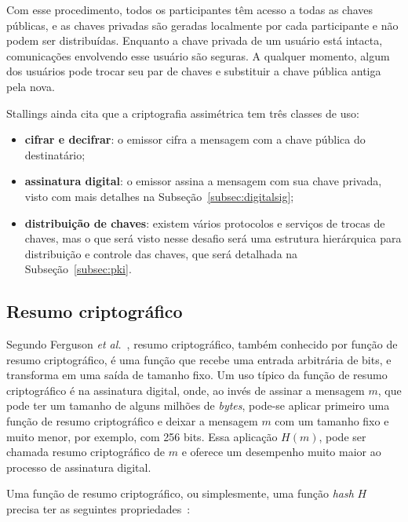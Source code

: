 \documentclass{article}
\begin{document}
Com esse procedimento, todos os participantes têm acesso a todas as chaves
públicas, e as chaves privadas são geradas localmente por cada participante
e não podem ser distribuídas. Enquanto a chave privada de um usuário está
intacta, comunicações envolvendo esse usuário são seguras. A qualquer momento,
algum dos usuários pode trocar seu par de chaves e substituir a chave pública
antiga pela nova.

Stallings ainda cita que a criptografia assimétrica tem três classes de uso:

\begin{itemize}
  \item \textbf{cifrar e decifrar}: o emissor cifra a mensagem com a chave
      pública do destinatário;

  \item \textbf{assinatura digital}: o emissor assina a mensagem com sua chave
      privada, visto com mais detalhes na Subseção~\ref{subsec:digitalsig};

  \item \textbf{distribuição de chaves}: existem vários protocolos e serviços
      de trocas de chaves, mas o que será visto nesse desafio será uma
        estrutura hierárquica para distribuição e controle das chaves, que será
        detalhada na Subseção~\ref{subsec:pki}.
\end{itemize}

\subsection{Resumo criptográfico}\label{subsec:hash}

Segundo Ferguson \textit{et al.}~\cite{Ferguson:book:2011}, resumo
criptográfico, também conhecido por função de resumo criptográfico, é uma
função que recebe uma entrada arbitrária de bits, e transforma em uma saída de
tamanho fixo. Um uso típico da função de resumo criptográfico é na assinatura
digital, onde, ao invés de assinar a mensagem $m$, que pode ter um tamanho de
alguns milhões de \textit{bytes}, pode-se aplicar primeiro uma função de resumo
criptográfico e deixar a mensagem $m$ com um tamanho fixo e muito menor, por
exemplo, com 256 bits. Essa aplicação $H(m)$, pode ser chamada resumo
criptográfico de $m$ e oferece um desempenho muito maior ao processo de
assinatura digital.

Uma função de resumo criptográfico, ou simplesmente, uma função \textit{hash}
$H$ precisa ter as seguintes propriedades~\cite{Stallings:book:2016}:
\end{document}
